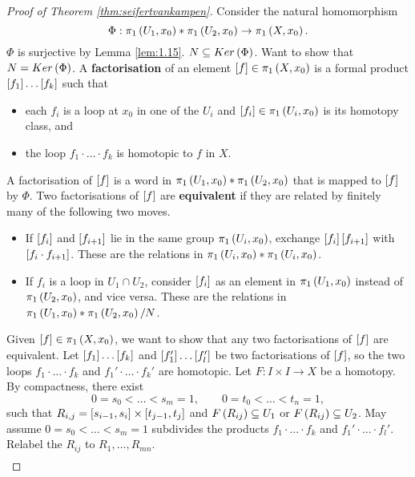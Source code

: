 \begin{proof}[Proof of Theorem \ref{thm:seifertvankampen}]
Consider the natural homomorphism
$$ \Phi : \pi_1\rb{U_1, x_0} * \pi_1\rb{U_2, x_0} \to \pi_1\rb{X, x_0}. $$
$ \Phi $ is surjective by Lemma \ref{lem:1.15}. $ N \subseteq Ker\rb{\Phi} $. Want to show that $ N = Ker\rb{\Phi} $. A \textbf{factorisation} of an element $ \sb{f} \in \pi_1\rb{X, x_0} $ is a formal product $ \sb{f_1} \dots \sb{f_k} $ such that
\begin{itemize}
\item each $ f_i $ is a loop at $ x_0 $ in one of the $ U_i $ and $ \sb{f_i} \in \pi_1\rb{U_i, x_0} $ is its homotopy class, and
\item the loop $ f_1 \cdot \dots \cdot f_k $ is homotopic to $ f $ in $ X $.
\end{itemize}
A factorisation of $ \sb{f} $ is a word in $ \pi_1\rb{U_1, x_0} * \pi_1\rb{U_2, x_0} $ that is mapped to $ \sb{f} $ by $ \Phi $. Two factorisations of $ \sb{f} $ are \textbf{equivalent} if they are related by finitely many of the following two moves.
\begin{itemize}
\item If $ \sb{f_i} $ and $ \sb{f_{i + 1}} $ lie in the same group $ \pi_1\rb{U_i, x_0} $, exchange $ \sb{f_i}\sb{f_{i + 1}} $ with $ \sb{f_i \cdot f_{i + 1}} $. These are the relations in $ \pi_1\rb{U_i, x_0} * \pi_1\rb{U_i, x_0} $.
\item If $ f_i $ is a loop in $ U_1 \cap U_2 $, consider $ \sb{f_i} $ as an element in $ \pi_1\rb{U_1, x_0} $ instead of $ \pi_1\rb{U_2, x_0} $, and vice versa. These are the relations in $ \pi_1\rb{U_1, x_0} * \pi_1\rb{U_2, x_0} / N $.
\end{itemize}
Given $ \sb{f} \in \pi_1\rb{X, x_0} $, we want to show that any two factorisations of $ \sb{f} $ are equivalent. Let $ \sb{f_1} \dots \sb{f_k} $ and $ \sb{f_1'} \dots \sb{f_l'} $ be two factorisations of $ \sb{f} $, so the two loops $ f_1 \cdot \dots \cdot f_k $ and $ f_1' \cdot \dots \cdot f_k' $ are homotopic. Let $ F : I \times I \to X $ be a homotopy. By compactness, there exist
$$ 0 = s_0 < \dots < s_m = 1, \qquad 0 = t_0 < \dots < t_n = 1, $$
such that $ R_{i, j} = \sb{s_{i - 1}, s_i} \times \sb{t_{j - 1}, t_j} $ and $ F\rb{R_{ij}} \subseteq U_1 $ or $ F\rb{R_{ij}} \subseteq U_2 $. May assume $ 0 = s_0 < \dots < s_m = 1 $ subdivides the products $ f_1 \cdot \dots \cdot f_k $ and $ f_1' \cdot \dots \cdot f_l' $. Relabel the $ R_{ij} $ to $ R_1, \dots, R_{mn} $.
$$
\begin{array}{|c|c|c|}

\end{array}$$
\end{proof}
